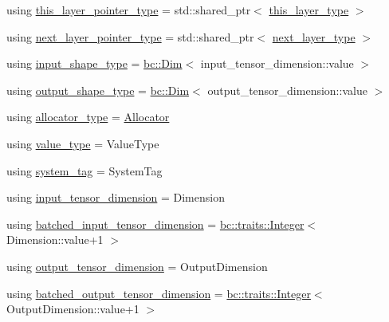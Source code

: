 \begin{DoxyCompactItemize}
\item 
using \hyperlink{structbc_1_1nn_1_1Polymorphic__Layer__Base_a6240b9012fcc8ed91d8a41f07d7c4bd9}{this\+\_\+layer\+\_\+pointer\+\_\+type} = std\+::shared\+\_\+ptr$<$ \hyperlink{structbc_1_1nn_1_1Polymorphic__Layer__Base_a6087076d2e0a31e6bbdc2c2039c3ab52}{this\+\_\+layer\+\_\+type} $>$
\item 
using \hyperlink{structbc_1_1nn_1_1Polymorphic__Layer__Base_a6f8d2b06bb46d0ef96d0857df2544731}{next\+\_\+layer\+\_\+pointer\+\_\+type} = std\+::shared\+\_\+ptr$<$ \hyperlink{structbc_1_1nn_1_1Polymorphic__Layer__Base_ac7d70db83e8370d2975d05401713f677}{next\+\_\+layer\+\_\+type} $>$
\item 
using \hyperlink{structbc_1_1nn_1_1Polymorphic__Layer__Base_ad69ba46ce14f9fbef88b834828052ab4}{input\+\_\+shape\+\_\+type} = \hyperlink{structbc_1_1Dim}{bc\+::\+Dim}$<$ input\+\_\+tensor\+\_\+dimension\+::value $>$
\item 
using \hyperlink{structbc_1_1nn_1_1Polymorphic__Layer__Base_a130df92a457150349fe554eeee4dd32a}{output\+\_\+shape\+\_\+type} = \hyperlink{structbc_1_1Dim}{bc\+::\+Dim}$<$ output\+\_\+tensor\+\_\+dimension\+::value $>$
\item 
using \hyperlink{structbc_1_1nn_1_1Polymorphic__Layer__Base_a1414f8c37dea6254aebf63e4486ed818}{allocator\+\_\+type} = \hyperlink{classbc_1_1allocators_1_1Allocator}{Allocator}
\item 
using \hyperlink{structbc_1_1nn_1_1Polymorphic__Layer__Base_aa7d46845ee0a4544003a6f8fe3b7f52a}{value\+\_\+type} = Value\+Type
\item 
using \hyperlink{structbc_1_1nn_1_1Polymorphic__Layer__Base_a038901ff126b59392a45ffb2d839b3b0}{system\+\_\+tag} = System\+Tag
\item 
using \hyperlink{structbc_1_1nn_1_1Polymorphic__Layer__Base_a9cf367e8f043b3bc7ac8ce8f5aeaa832}{input\+\_\+tensor\+\_\+dimension} = Dimension
\item 
using \hyperlink{structbc_1_1nn_1_1Polymorphic__Layer__Base_a5ad2ab7a9e1bef167adba39b581bdeac}{batched\+\_\+input\+\_\+tensor\+\_\+dimension} = \hyperlink{structbc_1_1traits_1_1Integer}{bc\+::traits\+::\+Integer}$<$ Dimension\+::value+1 $>$
\item 
using \hyperlink{structbc_1_1nn_1_1Polymorphic__Layer__Base_a099ec870d177606464f40dfb496d31a2}{output\+\_\+tensor\+\_\+dimension} = Output\+Dimension
\item 
using \hyperlink{structbc_1_1nn_1_1Polymorphic__Layer__Base_a012247fd372f38d7156bda51bdd74a70}{batched\+\_\+output\+\_\+tensor\+\_\+dimension} = \hyperlink{structbc_1_1traits_1_1Integer}{bc\+::traits\+::\+Integer}$<$ Output\+Dimension\+::value+1 $>$

\end{DoxyCompactItemize}
